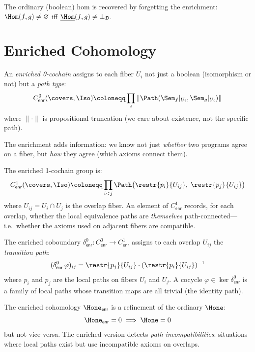 The ordinary (boolean) hom is recovered by forgetting the enrichment:
$\Hom(f,g) \neq \varnothing$ iff
$\underline{\Hom}(f,g) \neq \bot_{\mathcal{D}}$.

\section{Enriched Cohomology}

\begin{definition}
An \emph{enriched 0-cochain} assigns to each fiber $U_i$ not just a
boolean (isomorphism or not) but a \emph{path type}:
\[
  C^0_\mathsf{enr}(\covers, \Iso) \coloneqq \prod_i
    \|\Path(\Sem_f|_{U_i}, \Sem_g|_{U_i})\|
\]
where $\|\cdot\|$ is propositional truncation (we care about
existence, not the specific path).
\end{definition}

The enrichment adds information: we know not just \emph{whether} two
programs agree on a fiber, but \emph{how} they agree (which axioms
connect them).

\begin{definition}
The enriched 1-cochain group is:
\[
  C^1_\mathsf{enr}(\covers, \Iso) \coloneqq \prod_{i < j}
    \Path\bigl(\restr{p_i}{U_{ij}},\; \restr{p_j}{U_{ij}}\bigr)
\]
where $U_{ij} = U_i \cap U_j$ is the overlap fiber.  An element of
$C^1_\mathsf{enr}$ records, for each overlap, whether the local
equivalence paths are \emph{themselves} path-connected---i.e.\
whether the axioms used on adjacent fibers are compatible.
\end{definition}

\begin{definition}
The enriched coboundary $\delta^0_\mathsf{enr} : C^0_\mathsf{enr}
\to C^1_\mathsf{enr}$ assigns to each overlap $U_{ij}$ the
\emph{transition path}:
\[
  (\delta^0_\mathsf{enr}\, \varphi)_{ij} = \restr{p_j}{U_{ij}}
    \cdot (\restr{p_i}{U_{ij}})^{-1}
\]
where $p_i$ and $p_j$ are the local paths on fibers $U_i$ and $U_j$.
A cocycle $\varphi \in \ker \delta^0_\mathsf{enr}$ is a family of
local paths whose transition maps are all trivial (the identity path).
\end{definition}

\begin{theorem}
\label{thm:enriched-descent}
The enriched cohomology $\Hone_\mathsf{enr}$ is a refinement of the
ordinary $\Hone$:
\[
  \Hone_\mathsf{enr} = 0 \implies \Hone = 0
\]
but not vice versa.  The enriched version detects \emph{path
incompatibilities}: situations where local paths exist but use
incompatible axioms on overlaps.
\end{theorem}

